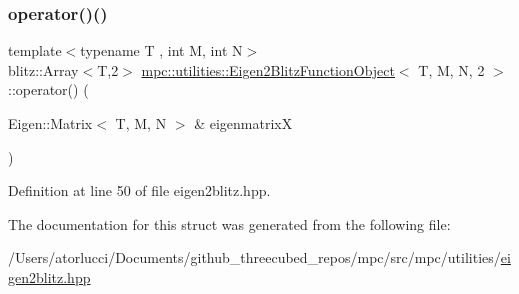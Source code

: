 \subsubsection{\texorpdfstring{operator()()}{operator()()}}
{\footnotesize\ttfamily template$<$typename T , int M, int N$>$ \\
blitz\+::\+Array$<$T,2$>$ \mbox{\hyperlink{structmpc_1_1utilities_1_1_eigen2_blitz_function_object}{mpc\+::utilities\+::\+Eigen2\+Blitz\+Function\+Object}}$<$ T, M, N, 2 $>$\+::operator() (\begin{DoxyParamCaption}\item[{Eigen\+::\+Matrix$<$ T, M, N $>$ \&}]{eigenmatrixX }\end{DoxyParamCaption})\hspace{0.3cm}{\ttfamily [inline]}}



Definition at line 50 of file eigen2blitz.\+hpp.



The documentation for this struct was generated from the following file\+:\begin{DoxyCompactItemize}
\item 
/\+Users/atorlucci/\+Documents/github\+\_\+threecubed\+\_\+repos/mpc/src/mpc/utilities/\mbox{\hyperlink{eigen2blitz_8hpp}{eigen2blitz.\+hpp}}\end{DoxyCompactItemize}

